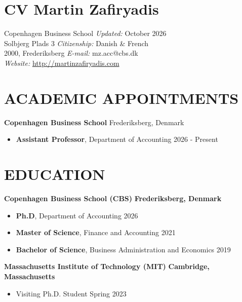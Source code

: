 \documentclass[letterpaper,9pt]{extarticle}
\begin{document}
\pagestyle{empty}

\section*{\huge\textbf{CV Martin Zafiryadis}} 
\begin{flushleft}
Copenhagen Business School \hfill \textit{Updated:} October 2026 \\
Solbjerg Plads 3 \hfill \textit{Citizenship:} Danish \& French \\
2000, Frederiksberg \hfill \textit{E-mail:} mz.acc@cbs.dk \\
\hfill \textit{Website:} \url{http://martinzafiryadis.com} 

\end{flushleft}

\section*{ACADEMIC APPOINTMENTS}
\noindent\textbf{Copenhagen Business School} \hfill Frederiksberg, Denmark
\begin{itemize}
    \item \textbf{Assistant Professor}, Department of Accounting \hfill 2026 - Present
\end{itemize}

\section*{EDUCATION}
\noindent
\textbf{Copenhagen Business School (CBS)} \hfill \textbf{Frederiksberg, Denmark}
\begin{itemize}
    \item \textbf{Ph.D}, Department of Accounting \hfill  2026  %
    \item \textbf{Master of Science}, Finance and Accounting \hfill 2021 %
    \item \textbf{Bachelor of Science}, Business Administration and Economics \hfill  2019 %
\end{itemize}

\noindent\textbf{Massachusetts Institute of Technology (MIT)} \hfill \textbf{Cambridge, Massachusetts}
\begin{itemize}
    \item Visiting Ph.D. Student  \hfill Spring 2023 
\end{itemize}
\end{document}
